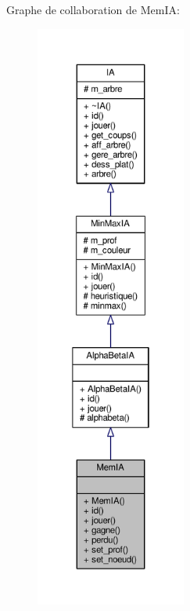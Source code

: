 Graphe de collaboration de Mem\+IA\+:\nopagebreak
\begin{figure}[H]
\begin{center}
\leavevmode
\includegraphics[height=550pt]{classMemIA__coll__graph}
\end{center}
\end{figure}

